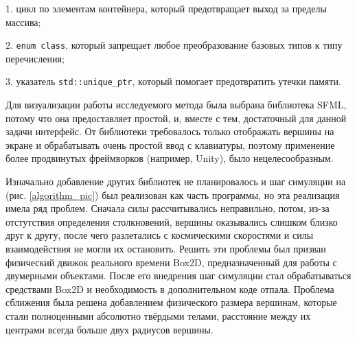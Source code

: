       1. цикл по элементам контейнера, который предотвращает выход за пределы массива;
      
      2. \lstinline{enum class}, который запрещает любое преобразование базовых типов к типу 
      перечисления;
      
      3. указатель \lstinline{std::unique_ptr}, который помогает предотвратить утечки памяти.
    
    Для визуализации работы исследуемого метода была выбрана библиотека SFML, 
    потому что она предоставляет простой, и, вместе с тем, достаточный для данной
    задачи интерфейс.
    От библиотеки требовалось только отображать вершины на экране и обрабатывать
    очень простой ввод с клавиатуры, поэтому применение более продвинутых фреймворков
    (например, Unity), было нецелесообразным.

    Изначально добавление других библиотек не планировалось и шаг симуляции на 
    (рис. \ref{algorithm_pic})
    был реализован как часть программы, но эта реализация имела ряд проблем.
    Сначала силы рассчитывались неправильно, потом, из-за отстутствия определения
    столкновений, вершины оказывались слишком близко друг к другу, после чего разлетались
    с космическими скоростями и силы взаимодействия не могли их остановить.
    Решить эти проблемы был призван физический движок реального времени Box2D, предназначенный
    для работы с двумерными объектами.
    После его внедрения шаг симуляции стал обрабатываться средствами Box2D и необходимость
    в дополнительном коде отпала.
    Проблема сближения была решена добавлением физического размера вершинам, которые
    стали полноценными абсолютно твёрдыми телами, расстояние между их центрами всегда
    больше двух радиусов вершины.

